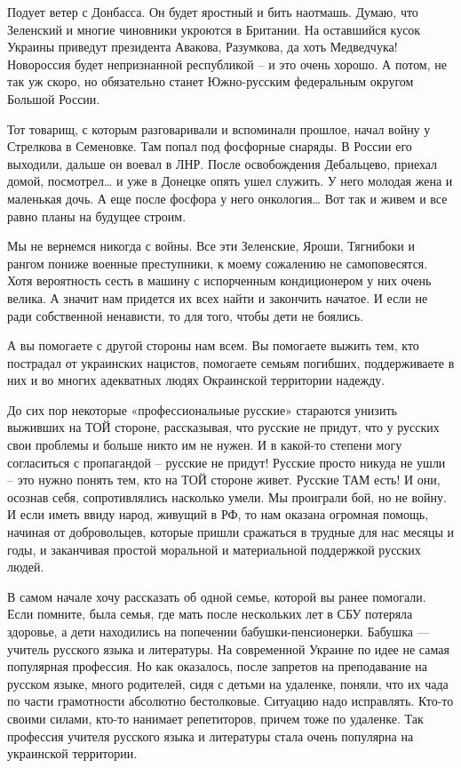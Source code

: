 Подует ветер с Донбасса. Он будет яростный и бить наотмашь. Думаю, что
Зеленский и многие чиновники укроются в Британии. На оставшийся кусок Украины
приведут президента Авакова, Разумкова, да хоть Медведчука! Новороссия будет
непризнанной республикой – и это очень хорошо. А потом, не так уж скоро, но
обязательно станет Южно-русским федеральным округом Большой России.

Тот товарищ, с которым разговаривали и вспоминали прошлое, начал войну у
Стрелкова в Семеновке. Там попал под фосфорные снаряды. В России его выходили,
дальше он воевал в ЛНР. После освобождения Дебальцево, приехал домой,
посмотрел… и уже в Донецке опять ушел служить. У него молодая жена и маленькая
дочь. А еще после фосфора у него онкология… Вот так и живем и все равно планы
на будущее строим.

Мы не вернемся никогда с войны. Все эти Зеленские, Яроши, Тягнибоки и рангом
пониже военные преступники, к моему сожалению не самоповесятся. Хотя
вероятность сесть в машину с испорченным кондиционером у них очень велика. А
значит нам придется их всех найти и закончить начатое. И если не ради
собственной ненависти, то для того, чтобы дети не боялись.

А вы помогаете с другой стороны нам всем. Вы помогаете выжить тем, кто
пострадал от украинских нацистов, помогаете семьям погибших, поддерживаете в
них и во многих адекватных людях Окраинской территории надежду.

До сих пор некоторые «профессиональные русские» стараются унизить выживших на
ТОЙ стороне, рассказывая, что русские не придут, что у русских свои проблемы и
больше никто им не нужен. И в какой-то степени могу согласиться с пропагандой –
русские не придут! Русские просто никуда не ушли – это нужно понять тем, кто на
ТОЙ стороне живет. Русские ТАМ есть! И они, осознав себя, сопротивлялись
насколько умели. Мы проиграли бой, но не войну. И если иметь ввиду народ,
живущий в РФ, то нам оказана огромная помощь, начиная от добровольцев, которые
пришли сражаться в трудные для нас месяцы и годы, и заканчивая простой
моральной и материальной поддержкой русских людей.

В самом начале хочу рассказать об одной семье, которой вы ранее помогали. Если
помните, была семья, где мать после нескольких лет в СБУ потеряла здоровье, а
дети находились на попечении бабушки-пенсионерки. Бабушка — учитель русского
языка и литературы. На современной Украине по идее не самая популярная
профессия. Но как оказалось, после запретов на преподавание на русском языке,
много родителей, сидя с детьми на удаленке, поняли, что их чада по части
грамотности абсолютно бестолковые. Ситуацию надо исправлять. Кто-то своими
силами, кто-то нанимает репетиторов, причем тоже по удаленке. Так профессия
учителя русского языка и литературы стала очень популярна на украинской
территории.

